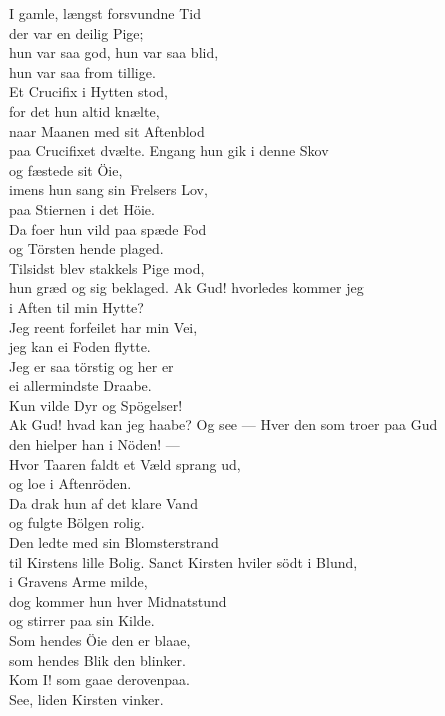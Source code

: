 
I gamle, længst forsvundne Tid\\
der var en deilig Pige;\\
hun var saa god, hun var saa blid,\\
hun var saa from tillige.\\
Et Crucifix i Hytten stod,\\
for det hun altid knælte,\\
naar Maanen med sit Aftenblod\\
paa Crucifixet dvælte.
\hops
Engang hun gik i denne Skov\\
og fæstede sit Öie,\\
imens hun sang sin Frelsers Lov,\\
paa Stiernen i det Höie.\\
Da foer hun vild paa spæde Fod\\
og Törsten hende plaged.\\
Tilsidst blev stakkels Pige mod,\\
hun græd og sig beklaged.
\hops
Ak Gud! hvorledes kommer jeg\\
i Aften til min Hytte?\\
Jeg reent forfeilet har min Vei,\\
jeg kan ei Foden flytte.\\
Jeg er saa törstig og her er\\
ei allermindste Draabe.\\
Kun vilde Dyr og Spögelser!\\
Ak Gud! hvad kan jeg haabe?
\hops
Og see — Hver den som troer paa Gud\\
den hielper han i Nöden! —\\
Hvor Taaren faldt et Væld sprang ud,\\
og loe i Aftenröden.\\
Da drak hun af det klare Vand\\
og fulgte Bölgen rolig.\\
Den ledte med sin Blomsterstrand\\
til Kirstens lille Bolig.
\hops
Sanct Kirsten hviler södt i Blund,\\
i Gravens Arme milde,\\
dog kommer hun hver Midnatstund\\
og stirrer paa sin Kilde.\\
Som hendes Öie den er blaae,\\
som hendes Blik den blinker.\\
Kom I! som gaae derovenpaa.\\
See, liden Kirsten vinker.\\

